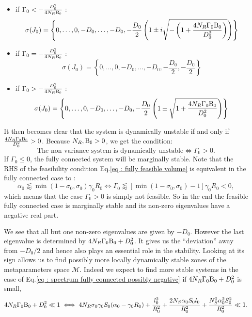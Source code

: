 \documentclass[12pt, titlepage, twoside, openright]{report}
\begin{document}
  \begin{itemize}
  \item if $\Gamma_0 < -\frac{D_0^2}{4 N_R \text{B}_0}$ :
  \begin{equation}
  \sigma(J_0)= \left\{0, \dots, 0, -D_0, \dots, -D_0, -\frac{D_0}{2} \left(1\pm i \sqrt{-\left(1+\frac{4N_R\Gamma_0\text{B}_0}{D_0^2}\right)}\right)\right\}
  \end{equation}
  \item if $\Gamma_0 = -\frac{D_0^2}{4 N_R \text{B}_0}$ :
  \begin{equation}
  \sigma(J_0)= \left\{0, \dots, 0, -D_0, \dots, -D_0, -\frac{D_0}{2}, -\frac{D_0}{2}\right\}
  \end{equation}
  \item if $\Gamma_0 > -\frac{D_0^2}{4 N_R \text{B}_0}$ :
  \begin{equation}
  \sigma(J_0)= \left\{0, \dots, 0, -D_0, \dots, -D_0, -\frac{D_0}{2} \left(1\pm \sqrt{1+\frac{4N_R\Gamma_0\text{B}_0}{D_0^2}}\right)\right\} \label{eq : spectrum fully connected possibly negative}
  \end{equation}
  \end{itemize}
  It then becomes clear that the system is dynamically unstable if and only if $\frac{4N_R\Gamma_0 \text{B}_0}{D_0^2} > 0 $. Because $N_R, \text{B}_0 > 0$, we get the condition:
  \begin{equation}
  \boxed{
  \text{The non-variance system is dynamically unstable} \iff \Gamma_0 > 0.
  }
  \end{equation}
  If $\Gamma_0 \leq 0$, the fully connected system will be marginally stable.
  Note that the RHS of the feasibility condition Eq.\eqref{eq : fully feasible volume} is equivalent in the fully connected case to :
  \begin{equation}
  \alpha_0 \lessapprox \min(1-\sigma_0, \sigma_0)\gamma_0 R_0 \iff \Gamma_0 \lessapprox \left[\min(1-\sigma_0, \sigma_0)-1\right] \gamma_0 R_0 < 0,
  \end{equation}
  which means that the case $\Gamma_0 > 0$ is simply not feasible. So in the end the feasible fully connected case is marginally stable and its non-zero eigenvalues have a negative real part.

  We see that all but one non-zero eigenvalues are given by $-D_0$. However the last eigenvalue is determined by
  $4N_R\Gamma_0\text{B}_0+D_0^2$. It gives us the ``deviation'' away from $-D_0/2$ and hence also plays an essential role in the stability. Looking at its sign allows us to find possibly more locally dynamically stable zones of the metaparameters space $\mathcal{M}$. Indeed we expect to find more stable systems in the case of Eq.\eqref{eq : spectrum fully connected possibly negative} if $4 N_R \Gamma_0 \text{B}_0 + D_0 ^2$ is small, \ie
  \begin{equation}
  4 N_R \Gamma_0 \text{B}_0 + D_0 ^2 \ll 1 \iff 4N_R \sigma_0 \gamma_0 S_0  (\alpha_0 - \gamma_0 R_0) +\frac{l_0^2}{R_0^2}+\frac{2N_S\alpha_0 S_0 l_0}{R_0^2} + \frac{N_S^2 \alpha_0^2 S_0^2}{R_0^2} \ll 1.
  \end{equation}
\end{document}
